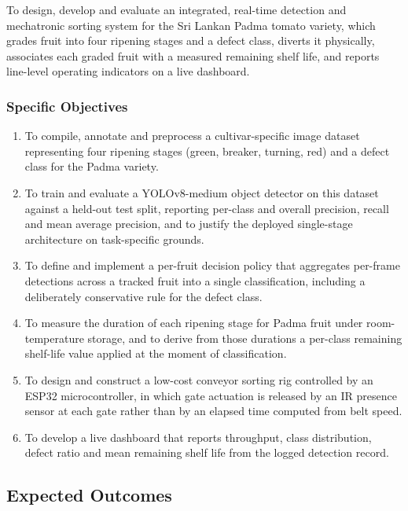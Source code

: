To design, develop and evaluate an integrated, real-time detection and mechatronic sorting system for the Sri Lankan Padma tomato variety, which grades fruit into four ripening stages and a defect class, diverts it physically, associates each graded fruit with a measured remaining shelf life, and reports line-level operating indicators on a live dashboard.

\subsubsection{Specific Objectives}

\begin{enumerate}
    \item To compile, annotate and preprocess a cultivar-specific image dataset representing four ripening stages (green, breaker, turning, red) and a defect class for the Padma variety.
    \item To train and evaluate a YOLOv8-medium object detector on this dataset against a held-out test split, reporting per-class and overall precision, recall and mean average precision, and to justify the deployed single-stage architecture on task-specific grounds.
    \item To define and implement a per-fruit decision policy that aggregates per-frame detections across a tracked fruit into a single classification, including a deliberately conservative rule for the defect class.
    \item To measure the duration of each ripening stage for Padma fruit under room-temperature storage, and to derive from those durations a per-class remaining shelf-life value applied at the moment of classification.
    \item To design and construct a low-cost conveyor sorting rig controlled by an ESP32 microcontroller, in which gate actuation is released by an \acrfull{IR} presence sensor at each gate rather than by an elapsed time computed from belt speed.
    \item To develop a live dashboard that reports throughput, class distribution, defect ratio and mean remaining shelf life from the logged detection record.
\end{enumerate}

\subsection{Expected Outcomes}
\label{sec:outcomes}

